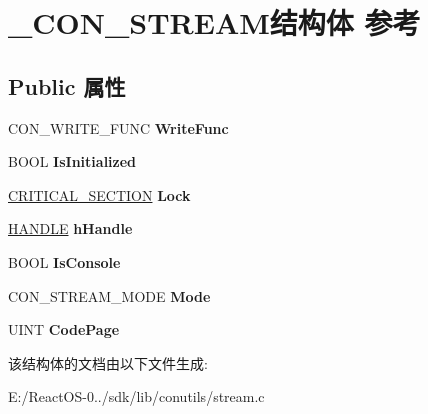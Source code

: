 \hypertarget{struct___c_o_n___s_t_r_e_a_m}{}\section{\+\_\+\+C\+O\+N\+\_\+\+S\+T\+R\+E\+A\+M结构体 参考}
\label{struct___c_o_n___s_t_r_e_a_m}
\subsection*{Public 属性}
\begin{DoxyCompactItemize}
\item 
\mbox{\label{struct___c_o_n___s_t_r_e_a_m_acf9ca0a2436fa220114c9286812907d9}} 
C\+O\+N\+\_\+\+W\+R\+I\+T\+E\+\_\+\+F\+U\+NC {\bfseries Write\+Func}
\item 
\mbox{\label{struct___c_o_n___s_t_r_e_a_m_afd174f06b8e3a9c1dc0f244f5125c733}} 
B\+O\+OL {\bfseries Is\+Initialized}
\item 
\mbox{\label{struct___c_o_n___s_t_r_e_a_m_ae6e875f241007de906ba6db51026bed3}} 
\hyperlink{struct___c_r_i_t_i_c_a_l___s_e_c_t_i_o_n}{C\+R\+I\+T\+I\+C\+A\+L\+\_\+\+S\+E\+C\+T\+I\+ON} {\bfseries Lock}
\item 
\mbox{\label{struct___c_o_n___s_t_r_e_a_m_a1aa313e6068627959661c2c4437c9c86}} 
\hyperlink{interfacevoid}{H\+A\+N\+D\+LE} {\bfseries h\+Handle}
\item 
\mbox{\label{struct___c_o_n___s_t_r_e_a_m_ab936dee1285c4b111e8fee0cea66ed37}} 
B\+O\+OL {\bfseries Is\+Console}
\item 
\mbox{\label{struct___c_o_n___s_t_r_e_a_m_a0375532000c97fdabf45775e26b6c99d}} 
C\+O\+N\+\_\+\+S\+T\+R\+E\+A\+M\+\_\+\+M\+O\+DE {\bfseries Mode}
\item 
\mbox{\label{struct___c_o_n___s_t_r_e_a_m_a0a28943e10ba8ee9c4a517f06f0853eb}} 
U\+I\+NT {\bfseries Code\+Page}
\end{DoxyCompactItemize}


该结构体的文档由以下文件生成\+:\begin{DoxyCompactItemize}
\item 
E\+:/\+React\+O\+S-\/0../sdk/lib/conutils/stream.\+c\end{DoxyCompactItemize}
